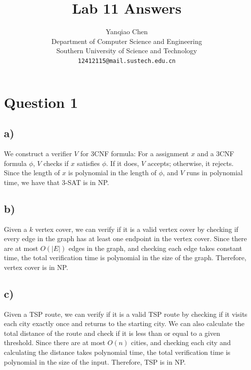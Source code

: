 \documentclass[a4paper, UTF-8]{article}
\theoremstyle{plain}
\begin{document}
\title{\bf{Lab 11 Answers}}
\author{Yanqiao Chen\\ 
  Department of Computer Science and Engineering\\
  Southern University of Science and Technology\\
  \texttt{12412115@mail.sustech.edu.cn}
  }
\maketitle

\section{Question 1} 

\subsection{a)} 

We construct a verifier $V$ for 3CNF formula: For a assignment $x$ and a 3CNF formula $\phi$, $V$ checks if $x$ satisfies $\phi$. If it does, $V$ accepts; otherwise, it rejects. Since the length of $x$ is polynomial in the length of $\phi$, and $V$ runs in polynomial time, we have that 3-SAT is in NP.

\subsection{b)} 

Given a $k$ vertex cover, we can verify if it is a valid vertex cover by checking if every edge in the graph has at least one endpoint in the vertex cover. Since there are at most $O(|E|)$ edges in the graph, and checking each edge takes constant time, the total verification time is polynomial in the size of the graph. Therefore, vertex cover is in NP.

\subsection{c)} 

Given a TSP route, we can verify if it is a valid TSP route by checking if it visits each city exactly once and returns to the starting city. We can also calculate the total distance of the route and check if it is less than or equal to a given threshold. Since there are at most $O(n)$ cities, and checking each city and calculating the distance takes polynomial time, the total verification time is polynomial in the size of the input. Therefore, TSP is in NP.
\end{document}
